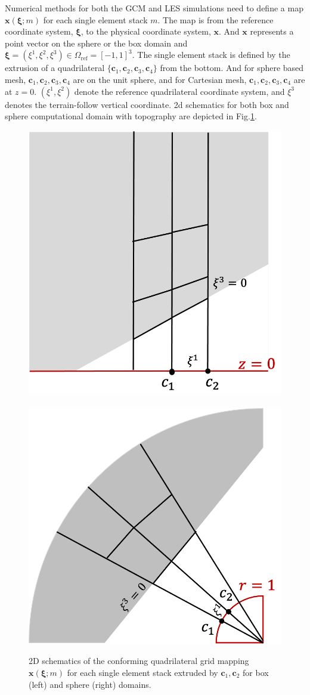 \documentclass{report}
\newcommand{\vb}{\mathbf}
\begin{document}
Numerical methods for both the GCM and LES simulations need to define a map $\mathbf{x}(\boldsymbol{\xi}; m)$ for each single element stack $m$. The map is from the reference coordinate system, $\boldsymbol{\xi}$, to the physical coordinate system, $\mathbf{x}$. And $\mathbf{x}$ represents a point vector on the sphere or the box domain and $\boldsymbol{\xi} = (\xi^1, \xi^2, \xi^3) \in \Omega_{\textrm{ref}} = [-1,1]^3$. 
The single element stack is defined by the extrusion of a quadrilateral $\{\vb{c}_1, \vb{c}_2, \vb{c}_3, \vb{c}_4\}$ from the bottom. And for sphere based mesh, $\vb{c}_1, \vb{c}_2, \vb{c}_3, \vb{c}_4$ are on the unit sphere, and for Cartesian mesh, $\vb{c}_1, \vb{c}_2, \vb{c}_3, \vb{c}_4$ are at $z = 0$.
$(\xi^1, \xi^2)$ denote the reference quadrilateral coordinate system, and $\xi^3$ denotes the terrain-follow vertical coordinate. 2d schematics for both box and sphere computational domain with topography are depicted in Fig.\ref{fig:conformingmapping}.
\begin{figure}[h]
    \centering
    \includegraphics[width=0.45 \textwidth]{CLIMA-numerics/figures/Cartesian-localmap.png}~~~
    \includegraphics[width=0.45 \textwidth]{CLIMA-numerics/figures/Sphere-localmap.png}
    \caption{2D schematics of the conforming quadrilateral grid mapping $\mathbf{x}(\boldsymbol{\xi}; m)$ for each single element stack extruded by $\vb{c}_1, \vb{c}_2$ for box (left) and sphere (right) domains.}
    \label{fig:conformingmapping}
\end{figure}
\end{document}
